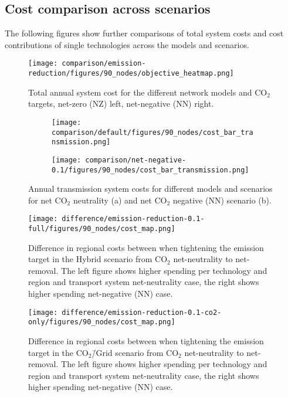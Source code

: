 \documentclass[twocolumn]{article}
\newcommand{\carbon}{CO$_2$}
\newcommand{\carbonscenario}{CO$_2$\=/Grid scenario}
\newcommand{\hybridscenario}{Hybrid scenario}
\begin{document}
\clearpage
\subsection{Cost comparison across scenarios}
\label{sec:cost_comparison}

The following figures show further comparisons of total system costs and cost contributions of single technologies across the models and scenarios.

\begin{figure}[h!]
    \centering
    \texttt{[image: comparison/emission-reduction/figures/90\_nodes/objective\_heatmap.png]}
    \caption{Total annual system cost for the different network models and \carbon{} targets, net-zero (NZ) left, net-negative (NN) right.}
    \label{fig:objective_heatmap}
\end{figure}

\begin{figure}[h!]
    \centering
    \begin{subfigure}{.5\textwidth}
        \centering
        \texttt{[image: comparison/default/figures/90\_nodes/cost\_bar\_transmission.png]}
        \caption{}
        \label{fig:cost_bar_transmission}
    \end{subfigure}%
    \begin{subfigure}{.5\textwidth}
        \centering
        \texttt{[image: comparison/net-negative-0.1/figures/90\_nodes/cost\_bar\_transmission.png]}
        \caption{}
        \label{fig:cost_bar_transmission_nn}
    \end{subfigure}
    \caption{Annual transmission system costs for different models and scenarios for net \carbon{} neutrality (a) and net \carbon{} negative (NN) scenario (b).}
\end{figure}


\begin{figure}[ht!]
    \centering
    \texttt{[image: difference/emission-reduction-0.1-full/figures/90\_nodes/cost\_map.png]}
    \caption{Difference in regional costs between when tightening the emission target in the \hybridscenario{} from \carbon{} net-neutrality to net-removal. The left figure shows higher spending per technology and region and transport system net-neutrality case, the right shows higher spending net-negative (NN) case.}
    \label{fig:cost_map_difference_full_nn}
\end{figure}


\begin{figure}[ht!]
    \centering
    \texttt{[image: difference/emission-reduction-0.1-co2-only/figures/90\_nodes/cost\_map.png]}
    \caption{Difference in regional costs between when tightening the emission target in the \carbonscenario{} from \carbon{} net-neutrality to net-removal. The left figure shows higher spending per technology and region and transport system net-neutrality case, the right shows higher spending net-negative (NN) case.}
    \label{fig:cost_map_difference_co2_nn}
\end{figure}
\end{document}
